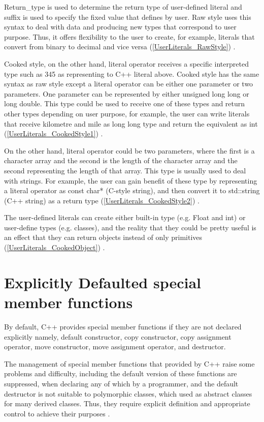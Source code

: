 \documentclass[11pt]{report}
\begin{document}
Return\_type is used to determine the return type of user-defined literal and suffix is used to specify the fixed value that defines by user. Raw style uses this syntax to deal with data and producing new types that correspond to user purpose.  Thus, it offers flexibility to the user to create, for example, literals that convert from binary to decimal and vice versa (\ref{UserLiterals_RawStyle}) \cite{Gregorie:professionalcpp}.


Cooked style, on the other hand, literal operator receives a specific interpreted type such as 345 as representing to C++ literal above. Cooked style has the same syntax as raw style except a literal operator can be either one parameter or two parameters. One parameter can be represented by either unsigned long long or long double. This type could be used to receive one of these types and return other types depending on user purpose, for example, the user can write literals that receive kilometre and mile as long long type and return the equivalent as int (\ref{UserLiterals_CookedStyle1}) \cite{Gregorie:professionalcpp}.


On the other hand, literal operator could be two parameters, where the first is a character array and the second is the length of the character array and the second representing the length of that array. This type is usually used to deal with strings. For example, the user can gain benefit of these type by representing a literal operator as const char* (C-style string), and then convert it to std::string (C++ string) as a return type (\ref{UserLiterals_CookedStyle2}) \cite{Gregorie:professionalcpp}.


The user-defined literals can create either built-in type (e.g.  Float and int) or user-define types (e.g. classes), and the reality that they could be pretty useful is an effect that they can return objects instead of only primitives (\ref{UserLiterals_CookedObject}) \cite{Gregorie:professionalcpp}.


\section{Explicitly Defaulted special member functions}
\label{section: Defaulted special member functions}
By default, C++ provides special member functions if they are not declared explicitly namely, default constructor, copy constructor, copy assignment operator, move constructor, move assignment operator, and destructor.


The management of special member functions that provided by C++ raise some problems and difficulty, including the default version of these functions are suppressed, when declaring any of which by a programmer, and the default destructor is not suitable to polymorphic classes, which used as abstract classes for many derived classes. Thus, they require explicit definition and appropriate control to achieve their purposes \cite{ISO:2011:Cpplanguage}.
\end{document}
